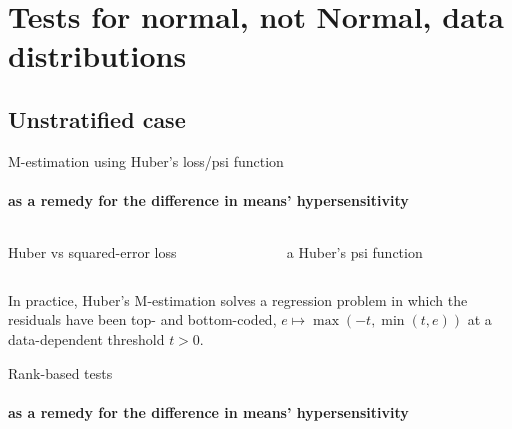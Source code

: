 \section{Tests for normal, not Normal, data distributions}


\subsection{Unstratified case}

\begin{frame}{M-estimation using Huber's loss/psi function} \framesubtitle{as a remedy for the difference in means' hypersensitivity}
  \begin{columns}
    \begin{Column}
          \begin{center}
         { Huber vs squared-error loss}
    \end{center}
    \end{Column}
    \begin{Column}
          \begin{center}a
         { Huber's psi function}
    \end{center}

    \end{Column}
  \end{columns}
\pause
In practice, Huber's M-estimation solves a regression problem in which
the residuals have been top- and bottom-coded, $e \mapsto \max(-t,
\min(t,e))$ at a data-dependent threshold $t>0$.
\end{frame}
\begin{frame}{Rank-based tests } \framesubtitle{as a remedy for the difference in means' hypersensitivity}
  
\end{frame}

